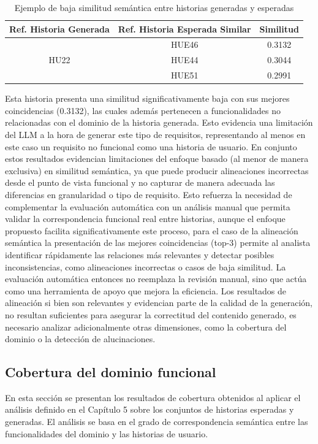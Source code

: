 \begin{table}[H]
\centering
\small
\begin{tabular}{|c|c|c|}
\hline
\textbf{Ref. Historia Generada} & \textbf{Ref. Historia Esperada Similar} & \textbf{Similitud} \\
\hline

\multirow{3}{*}{HU22} & HUE46 & 0.3132 \\
\cline{2-3}
                      & HUE44 & 0.3044 \\
\cline{2-3}
                      & HUE51 & 0.2991 \\
\hline

\end{tabular}
\caption{Ejemplo de baja similitud semántica entre historias generadas y esperadas}
\label{tab:low_similarity_example}
\end{table}

Esta historia presenta una similitud significativamente baja con sus mejores coincidencias (0.3132), las cuales además pertenecen a funcionalidades no relacionadas con el dominio de la historia generada. Esto evidencia una limitación del LLM a la hora de generar este tipo de requisitos, representando al menos en este caso un requisito no funcional como una historia de usuario.
En conjunto estos resultados evidencian limitaciones del enfoque basado (al menor de manera exclusiva) en similitud semántica, ya que puede producir alineaciones incorrectas desde el punto de vista funcional y no capturar de manera adecuada las diferencias en granularidad o tipo de requisito.
Esto refuerza la necesidad de complementar la evaluación automática con un análisis manual que permita validar la correspondencia funcional real entre historias, aunque  el enfoque propuesto facilita significativamente este proceso, para el caso de la alineación semántica la presentación de las mejores coincidencias (top-3) permite al analista identificar rápidamente las relaciones más relevantes y detectar posibles inconsistencias, como alineaciones incorrectas o casos de baja similitud. La evaluación automática entonces no reemplaza la revisión manual, sino que actúa como una herramienta de apoyo que mejora la eficiencia. 
Los resultados de alineación si bien son relevantes y evidencian parte de la calidad de la generación, no resultan suficientes para asegurar la correctitud del contenido generado, es necesario analizar adicionalmente otras dimensiones, como la cobertura del dominio o la detección de alucinaciones.

\subsection{Cobertura del dominio funcional}
En esta sección se presentan los resultados de cobertura obtenidos al aplicar el análisis definido en el Capítulo 5 sobre los conjuntos de historias esperadas y generadas. El análisis se basa en el grado de correspondencia semántica entre las funcionalidades del dominio y las historias de usuario.

